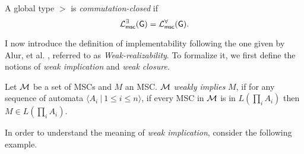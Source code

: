 \bigskip

\begin{definition}
    A global type $\gt$ is \emph{commutation-closed} if
    $$
    \mathcal{L}_{\mathsf{msc}}^{\exists}(\mathsf{G}) = \mathcal{L}_{\mathsf{msc}}^{\forall}(\mathsf{G}).
    $$
\end{definition}

I now introduce the definition of implementability following the one given 
by Alur, et al. \cite{alur2005realizability}, referred to as 
\textit{Weak-realizability}.
To formalize it, we first define the notions of 
\textit{weak implication} and \textit{weak closure}.


\bigskip

\begin{definition}
	Let $\mathcal{M}$ be a set of MSCs and $M$ an MSC. $\mathcal{M}$
	\textit{weakly implies} $M$, if for any sequence of automata
	$\langle A_i \ |\ 1\leq i\leq n\rangle$, if every MSC in $\mathcal{M}$ is in
	$L(\prod_i A_i)$ then $M \in L(\prod_i A_i)$.
\end{definition}

In order to understand the meaning of \emph{weak implication},
consider the following example.

\bigskip

